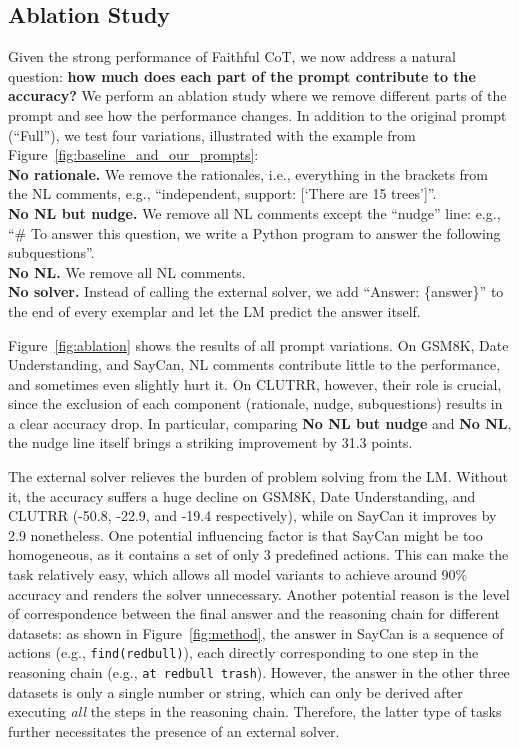 \documentclass[11pt]{article}
\begin{document}
\subsection{Ablation Study}
\label{sec:analysis_ablation}




Given the strong performance of Faithful CoT, we now address a natural question: \textbf{how much does each part of the prompt contribute to the accuracy?} We perform an ablation study where we remove different parts of the prompt and see how the performance changes. In addition to the original prompt (``Full''), we test four variations, illustrated with the example from Figure~\ref{fig:baseline_and_our_prompts}:\\
\textbf{No rationale.} We remove the rationales, i.e., everything in the brackets from the NL comments, e.g., ``independent, support: [`There are 15 trees']''.\\
\textbf{No NL but nudge.} We remove all NL comments except the ``nudge'' line: e.g., ``\# To answer this question, we write a Python program to answer the following subquestions''.\\
\textbf{No NL.} We remove all NL comments.\\
\textbf{No solver.} Instead of calling the external solver, we add ``Answer: \{answer\}'' to the end of every exemplar and let the LM predict the answer itself.

Figure~\ref{fig:ablation} shows the results of all prompt variations. On GSM8K, Date Understanding, and SayCan, NL comments contribute little to the performance, and sometimes even slightly hurt it. On CLUTRR, however, their role is crucial, since the exclusion of each component (rationale, nudge, subquestions) results in a clear accuracy drop. In particular, comparing \textbf{No NL but nudge} and \textbf{No NL}, the nudge line itself brings a striking improvement by 31.3 points. 

The external solver relieves the burden of problem solving from the LM. Without it, the accuracy suffers a huge decline on GSM8K, Date Understanding, and CLUTRR (-50.8, -22.9, and -19.4 respectively), while on SayCan it improves by 2.9 nonetheless. One potential influencing factor is that SayCan might be too homogeneous, as it contains a set of only 3 predefined actions. This can make the task relatively easy, which allows all model variants to achieve around 90\% accuracy and renders the solver unnecessary. Another potential reason is the level of correspondence between the final answer and the reasoning chain for different datasets: as shown in Figure~\ref{fig:method}, the answer in SayCan is a sequence of actions (e.g., \texttt{find(redbull)}), each directly corresponding to one step in the reasoning chain (e.g., \texttt{at redbull trash}). However, the answer in the other three datasets is only a single number or string, which can only be derived after executing \textit{all} the steps in the reasoning chain. Therefore, the latter type of tasks further necessitates the presence of an external solver.
\end{document}
